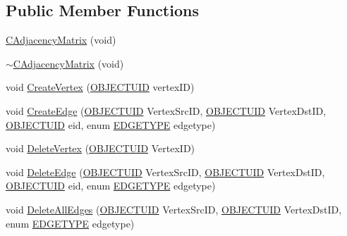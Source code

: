 \subsection*{Public Member Functions}
\begin{DoxyCompactItemize}
\item 
\hyperlink{class_c_adjacency_matrix_aeaf2a5a409a40d78e34845f87cd3957b}{C\+Adjacency\+Matrix} (void)
\item 
\hyperlink{class_c_adjacency_matrix_a45c2bfa15ee6d8c5c8109f641a4788e9}{$\sim$\+C\+Adjacency\+Matrix} (void)
\item 
void \hyperlink{class_c_adjacency_matrix_a6bad20604ba6b64ce815dc9de17b4ef7}{Create\+Vertex} (\hyperlink{_object_database_defines_8h_a164ec120b01429b93c9cd0bef2a67e64}{O\+B\+J\+E\+C\+T\+U\+I\+D} vertex\+I\+D)
\item 
void \hyperlink{class_c_adjacency_matrix_a2ed4709f0d4ed27a06fdc5f9694a1170}{Create\+Edge} (\hyperlink{_object_database_defines_8h_a164ec120b01429b93c9cd0bef2a67e64}{O\+B\+J\+E\+C\+T\+U\+I\+D} Vertex\+Src\+I\+D, \hyperlink{_object_database_defines_8h_a164ec120b01429b93c9cd0bef2a67e64}{O\+B\+J\+E\+C\+T\+U\+I\+D} Vertex\+Dst\+I\+D, \hyperlink{_object_database_defines_8h_a164ec120b01429b93c9cd0bef2a67e64}{O\+B\+J\+E\+C\+T\+U\+I\+D} eid, enum \hyperlink{class_c_adjacency_matrix_a0a423c30d8ec51bbdb1dbc7c192372e5}{E\+D\+G\+E\+T\+Y\+P\+E} edgetype)
\item 
void \hyperlink{class_c_adjacency_matrix_ac3b37bce7330d5b5f627d06afbbca417}{Delete\+Vertex} (\hyperlink{_object_database_defines_8h_a164ec120b01429b93c9cd0bef2a67e64}{O\+B\+J\+E\+C\+T\+U\+I\+D} Vertex\+I\+D)
\item 
void \hyperlink{class_c_adjacency_matrix_a2e74cacc0b1efd5102be51c8fe36bd62}{Delete\+Edge} (\hyperlink{_object_database_defines_8h_a164ec120b01429b93c9cd0bef2a67e64}{O\+B\+J\+E\+C\+T\+U\+I\+D} Vertex\+Src\+I\+D, \hyperlink{_object_database_defines_8h_a164ec120b01429b93c9cd0bef2a67e64}{O\+B\+J\+E\+C\+T\+U\+I\+D} Vertex\+Dst\+I\+D, \hyperlink{_object_database_defines_8h_a164ec120b01429b93c9cd0bef2a67e64}{O\+B\+J\+E\+C\+T\+U\+I\+D} eid, enum \hyperlink{class_c_adjacency_matrix_a0a423c30d8ec51bbdb1dbc7c192372e5}{E\+D\+G\+E\+T\+Y\+P\+E} edgetype)
\item 
void \hyperlink{class_c_adjacency_matrix_af19b09f7a407a3d0c0d1082b56fac3b9}{Delete\+All\+Edges} (\hyperlink{_object_database_defines_8h_a164ec120b01429b93c9cd0bef2a67e64}{O\+B\+J\+E\+C\+T\+U\+I\+D} Vertex\+Src\+I\+D, \hyperlink{_object_database_defines_8h_a164ec120b01429b93c9cd0bef2a67e64}{O\+B\+J\+E\+C\+T\+U\+I\+D} Vertex\+Dst\+I\+D, enum \hyperlink{class_c_adjacency_matrix_a0a423c30d8ec51bbdb1dbc7c192372e5}{E\+D\+G\+E\+T\+Y\+P\+E} edgetype)

\end{DoxyCompactItemize}
